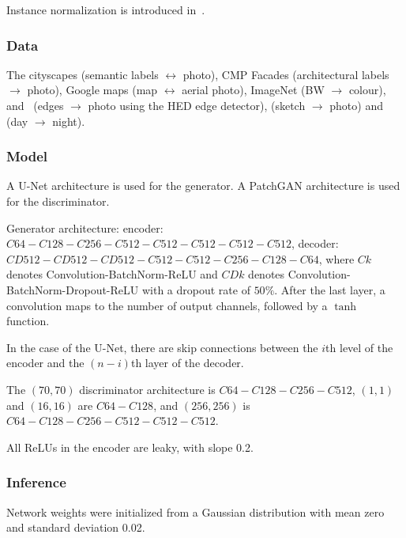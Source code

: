 \documentclass[a4paper, 12pt]{article}
\begin{document}
Instance normalization is introduced in~\citet{DBLP:journals/corr/UlyanovVL16}.

\subsubsection{Data}

The cityscapes\citet{Cordts_2016_CVPR} (semantic labels $\leftrightarrow$
photo), CMP Facades (architectural labels $\rightarrow$ photo), Google maps
(map $\leftrightarrow$ aerial photo),
ImageNet\citet{DBLP:journals/corr/RussakovskyDSKSMHKKBBF14} (BW $\rightarrow$
colour), \citet{zhu2016generative} and~\citet{fine-grained} (edges
$\rightarrow$ photo using the HED edge
detector\citet{DBLP:journals/corr/XieT15}),
\citet{Eitz:2012:HSO:2185520.2185540} (sketch $\rightarrow$ photo) and
\citet{Laffont14} (day $\rightarrow$ night).

\subsubsection{Model}

A U-Net\citet{DBLP:journals/corr/RonnebergerFB15} architecture is used for the
generator. A PatchGAN architecture\citet{DBLP:journals/corr/LiW16b} is used for
the discriminator.

Generator architecture: encoder: $C64-C128-C256-C512-C512-C512-C512-C512$,
decoder: $CD512-CD512-CD512-C512-C512-C256-C128-C64$, where $Ck$ denotes
Convolution-BatchNorm-ReLU and $CDk$ denotes
Convolution-BatchNorm-Dropout-ReLU with a dropout rate of $50\%$. After the
last layer, a convolution maps to the number of output channels, followed by a
$\tanh$ function.

In the case of the U-Net, there are skip connections between the $i$th level of
the encoder and the $(n - i)$th layer of the decoder.

The $(70, 70)$ discriminator architecture is $C64-C128-C256-C512$, $(1, 1)$ and
$(16, 16)$ are $C64-C128$, and $(256, 256)$ is $C64-C128-C256-C512-C512-C512$.

All ReLUs in the encoder are leaky, with slope 0.2.

\subsubsection{Inference}

Network weights were initialized from a Gaussian distribution with mean zero
and standard deviation 0.02.
\end{document}
